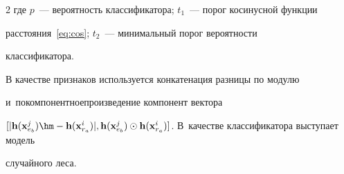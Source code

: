 \begin{multicols}{2}
где $p$~--- вероятность классификатора; $t_1$~--- порог косинусной  функции 


расстояния~\eqref{eq:cos}; $t_2$~--- минимальный порог вероятности 


классификатора. 





В качестве признаков используется конкате\-на\-ция разницы по модулю 


и~покомпонентное\linebreak произведение компонент вектора 


$[|\mathbf{h}(\mathbf{x}_{e_{b}}^j)\hm- 


\mathbf{h}(\mathbf{x}_{r_{a}}^i)|,\mathbf{h}(\mathbf{x}_{e_{b}}^j) \odot 


\mathbf{h}(\mathbf{x}_{r_{a}}^i)]$. В~качестве классификатора выступает модель 


случайного леса.





































\end{multicols}
